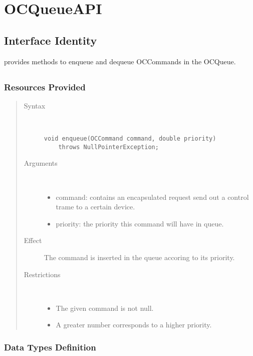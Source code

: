 \section{OCQueueAPI}
\label{api:oc-queue-api}

\subsection{Interface Identity}

\npar {} provides methods to enqueue and dequeue
OCCommands in the OCQueue.

\subsection{}

\subsubsection{Resources Provided}

\begin{quote}
	\begin{description}
		\item[Syntax] \ 
		\begin{verbatim}
void enqueue(OCCommand command, double priority) 
    throws NullPointerException;
		\end{verbatim}
		\item[Arguments] \
		\begin{itemize}
			\item command: contains an encapsulated request send out a control trame to
			a certain device.
			\item priority: the priority this command will have in queue. 
		\end{itemize}
		\item[Effect] The command is inserted in the queue accoring to its priority.
		\item[Restrictions] \ 
		\begin{itemize}
			\item The given command is not null.
			\item A greater number corresponds to a higher priority. 
		\end{itemize}
	\end{description} 
\end{quote}

\subsubsection{Data Types Definition}

